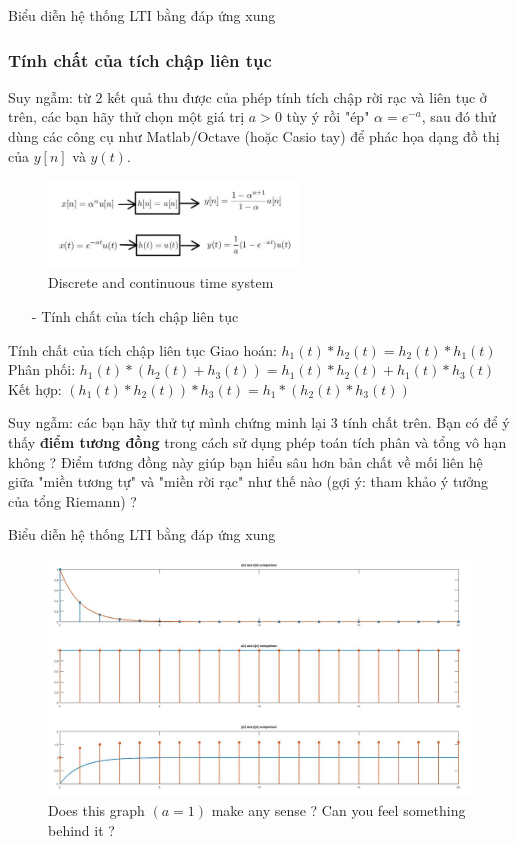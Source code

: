\documentclass[8pt]{beamer}
\begin{document}
\begin{frame}{Biểu diễn hệ thống LTI bằng đáp ứng xung}
\subsubsection{Tính chất của tích chập liên tục}
Suy ngẫm: từ $2$ kết quả thu được của phép tính tích chập rời rạc và liên tục ở trên, các bạn hãy thử chọn một giá trị $a>0$ tùy ý rồi "ép" $\alpha=e^{-a}$, sau đó thử dùng các công cụ như Matlab/Octave (hoặc Casio tay) để phác họa dạng đồ thị của $y[n]$ và $y(t)$.

\begin{figure}[h]
			\includegraphics[width=0.6\textwidth]{result.jpg}
			\caption{Discrete and continuous time system}\label{fig:re9}
		\end{figure}
\begin{itemize}
	\item[-] Tính chất của tích chập liên tục
\end{itemize}
\begin{block}{Tính chất của tích chập liên tục}
	Giao hoán: $h_{1}(t)*h_{2}(t)=h_{2}(t)*h_{1}(t)$\\
	Phân phối: $h_{1}(t)*(h_{2}(t)+h_{3}(t))=h_{1}(t)*h_{2}(t)+h_{1}(t)*h_{3}(t)$\\
	Kết hợp: $(h_{1}(t)*h_{2}(t))*h_{3}(t)=h_{1}*(h_{2}(t)*h_{3}(t))$\\
\end{block}
Suy ngẫm: các bạn hãy thử tự mình chứng minh lại $3$ tính chất trên. Bạn có để ý thấy \textbf{điểm tương đồng} trong cách sử dụng phép toán tích phân và tổng vô hạn không ? Điểm tương đồng này giúp bạn hiểu sâu hơn bản chất về mối liên hệ giữa "miền tương tự" và "miền rời rạc" như thế nào (gợi ý: tham khảo ý tưởng của tổng Riemann) ?
\end{frame}
\begin{frame}{Biểu diễn hệ thống LTI bằng đáp ứng xung}
\begin{figure}[h]
			\includegraphics[width=1\textwidth]{test.jpg}
			\caption{Does this graph $(a=1)$ make any sense ? Can you feel something behind it ?}\label{fig:re10}
		\end{figure}
\end{frame}
\end{document}
